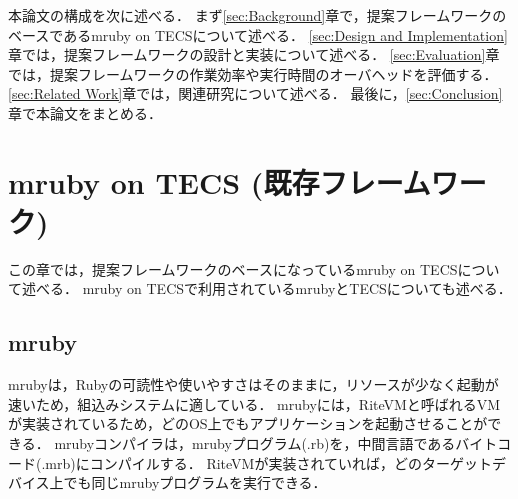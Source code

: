 \documentclass[submit,techrep]{ipsj}
\begin{document}
本論文の構成を次に述べる．
まず\ref{sec:Background}章で，提案フレームワークのベースであるmruby on TECSについて述べる．
\ref{sec:Design and Implementation}章では，提案フレームワークの設計と実装について述べる．
\ref{sec:Evaluation}章では，提案フレームワークの作業効率や実行時間のオーバヘッドを評価する．
\ref{sec:Related Work}章では，関連研究について述べる．
最後に，\ref{sec:Conclusion}章で本論文をまとめる．


 \section{mruby on TECS (既存フレームワーク)}
\vspace{-2mm}
\label{sec:Background}
%
この章では，提案フレームワークのベースになっているmruby on TECSについて述べる．
mruby on TECSで利用されているmrubyとTECSについても述べる．

\subsection{mruby}

mrubyは，Rubyの可読性や使いやすさはそのままに，リソースが少なく起動が速いため，組込みシステムに適している．
mrubyには，RiteVMと呼ばれるVMが実装されているため，どのOS上でもアプリケーションを起動させることができる．
mrubyコンパイラは，mrubyプログラム(.rb)を，中間言語であるバイトコード(.mrb)にコンパイルする．
RiteVMが実装されていれば，どのターゲットデバイス上でも同じmrubyプログラムを実行できる．
\end{document}
